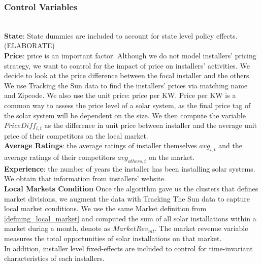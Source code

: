 \documentclass[msom,blindrev]{informs3}
\begin{document}
\subsubsection{Control Variables}\hfill\\
\textbf{State}: State dummies are included to account for state level policy effects. (ELABORATE)\\
\textbf{Price}: price is an important factor. Although we do not model installers' pricing strategy, we want to control for the impact of price on installers' activities. We decide to look at the price difference between the focal installer and the others. We use Tracking the Sun data to find the installers' prices via matching name and Zipcode. We also use the unit price: price per KW. Price per KW is a common way to assess the price level of a solar system, as the final price tag of the solar system will be dependent on the size. We then compute the variable $PriceDiff_{i,t}$ as the difference in unit price between installer and the average unit price of their competitors on the local market. \\
\textbf{Average Ratings}: the average ratings of installer themselves $avg_{i,t}$ and the average ratings of their competitors $avg_{others,t}$ on the market. \\
\textbf{Experience}: the number of years the installer has been installing solar systems. We obtain that information from installers' website. \\
\textbf{Local Markets Condition} Once the algorithm gave us the clusters that defines market divisions, we augment the data with Tracking The Sun data to capture local market conditions. We use the same Market definition from \ref{defining_local_market} and computed the sum of all solar installations within a market during a month, denote as $MarketRev_{mt}$. The market revenue variable measures the total opportunities of solar installations on that market. \\
In addition, installer level fixed-effects are included to control for time-invariant characteristics of each installers. 
\end{document}
